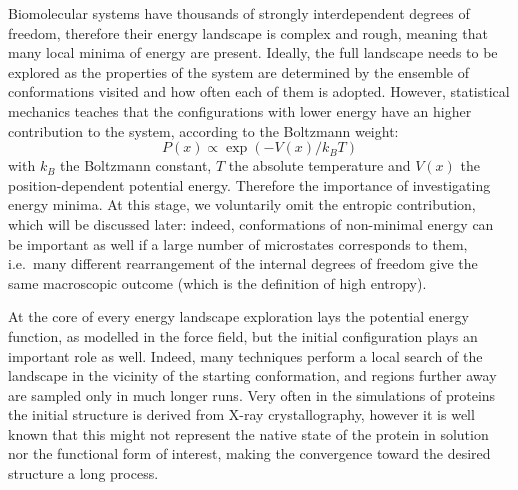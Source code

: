 Biomolecular systems have thousands of strongly interdependent degrees of freedom, therefore their energy landscape is complex and rough, meaning that many local minima of energy are present. Ideally, the full landscape needs to be explored as the properties of the system are determined by the ensemble of conformations visited and how often each of them is adopted. However, statistical mechanics teaches that the configurations with lower energy have an higher contribution to the system, according to the Boltzmann weight:
\begin{equation}
P(x) \propto \exp(-V(x)/k_BT)
\end{equation}
with $k_B$ the Boltzmann constant, $T$ the absolute temperature and $V(x)$ the position-dependent potential energy. Therefore the importance of investigating energy minima.
%
At this stage, we voluntarily omit the entropic contribution, which will be discussed later: indeed, conformations of non-minimal energy can be important as well if a large number of microstates corresponds to them, i.e.\ many different rearrangement of the internal degrees of freedom give the same macroscopic outcome (which is the definition of high entropy).

At the core of every energy landscape exploration lays the potential energy function, as modelled in the force field, but the initial configuration plays an important role as well.
%
Indeed, many techniques perform a local search of the landscape in the vicinity of the starting conformation, and regions further away are sampled only in much longer runs. Very often in the simulations of proteins the initial structure is derived from X-ray crystallography, however it is well known that this might not represent the native state of the protein in solution nor the functional form of interest, making the convergence toward the desired structure a long process.

